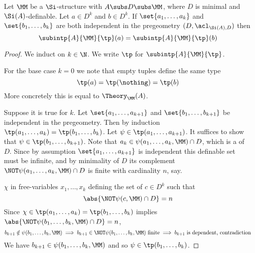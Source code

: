 \begin{lem}
    Let $\MM$ be a $\Si$-structure with $A \subs D \subs \MM$,
    where $D$ is minimal and $\Si(A)$-definable.
    Let $a \in D^k$ and $b \in D^k$. 
    If $\set{a_1,\dots,a_k}$ and $\set{b_1,\dots,b_k}$ are both 
    independent in the pregeometry $(D,\acl_{\Si(A),D})$
    then 
    \[\subintp{A}{\MM}{\tp}(a) = \subintp{A}{\MM}{\tp}(b)\]
\end{lem}
\begin{proof}
    We induct on $k \in \N$. 
    We write $\tp$ for $\subintp{A}{\MM}{\tp}$.

    For the base case $k = 0$ we note that empty tuples define the same type
    \[{\tp}(a) = {\tp}(\nothing)= {\tp}(b)\]
    More concretely this is equal to $\Theory_{\MM}(A)$.

    Suppose it is true for $k$.
    Let $\set{a_1,\dots,a_{k+1}}$ and $\set{b_1,\dots,b_{k+1}}$ be independent
    in the pregeometry.
    Then by induction $\tp(a_1,\dots,a_k) = \tp(b_1,\dots,b_k)$.
    Let $\psi \in \tp(a_1,\dots,a_{k+1})$.
    It suffices to show that $\psi \in \tp(b_1,\dots,b_{k+1})$.
    Note that $a_k \in \psi(a_1,\dots,a_k, \MM) \cap D$, 
    which is a  of $D$.
    Since by assumption $\set{a_1,\dots,a_{k+1}}$ is independent 
    this definable set must be infinite, 
    and by minimality of $D$ its complement 
    $\NOT \psi(a_1,\dots,a_k, \MM) \cap D$ is finite
    with cardinality $n$, say.
    
     $\chi$
    in free-variables $x_1,\dots,x_k$ defining the set of $c \in D^k$ such that
    \[\abs{\NOT \psi(c,\MM) \cap D} = n\]
    Since $\chi \in \tp(a_1,\dots,a_k) = \tp(b_1,\dots,b_k)$
    implies $\abs{\NOT \psi(b_1,\dots,b_k,\MM) \cap D} = n$,
    \[
        b_{k+1} \notin \psi(b_1,\dots,b_k,\MM) \implies 
        b_{k+1} \in \NOT \psi(b_1,\dots,b_k,\MM) \text{ finite} \implies 
        b_{k+1} \text{ is dependent, contradiction}
    \]
    We have $b_{k+1} \in \psi(b_1,\dots,b_k,\MM)$ and so 
    $\psi \in \tp(b_1,\dots,b_k)$.
\end{proof}

